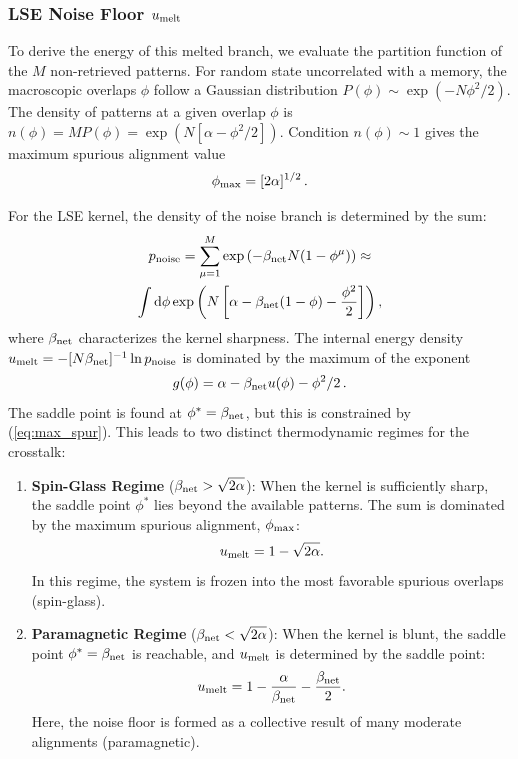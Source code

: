 \documentclass{article}
\newcommand{\dd}{{\mathrm{d}}}
\theoremstyle{plain}
\theoremstyle{definition}
\theoremstyle{remark}
\begin{document}
\subsubsection{LSE Noise Floor $u_{\rm melt}$}

To derive the energy of this melted branch, we evaluate the partition function of the $M$ non-retrieved patterns. For random state  uncorrelated with a memory, the macroscopic overlaps $\phi$ follow a Gaussian distribution $P(\phi) \sim \exp(-N\phi^2/2)$. The density of patterns at a given overlap $\phi$ is $n(\phi) = M P(\phi) = \exp(N[\alpha - \phi^2/2])$. Condition $n(\phi) \sim 1$ gives the maximum spurious alignment value 
\begin{equation}
    \phi_{\rm max} = [2\alpha]^{1/2}\,.
    \label{eq:max_spur}
\end{equation}

For the LSE kernel, the density of the noise branch is determined by the sum:
\begin{multline}
    p_{\rm noise} = \sum_{\mu=1}^{M} \exp\left( -\beta_{\rm net} N (1 - \phi^\mu) \right) \approx \\
    \int \dd\phi \exp\left( N \left[ \alpha - \beta_{\rm net}(1 - \phi) - \frac{\phi^2}{2} \right] \right),
\end{multline}
where $\beta_{\rm net}$ characterizes the kernel sharpness. The internal energy density $u_{\rm melt} = - [{N\beta_{\rm net}}]^{-1} \ln p_{\rm noise}$ is dominated by the maximum of the exponent 
\begin{equation}
    g(\phi) = \alpha - \beta_{\rm net} u(\phi) - \phi^2/2\,.
    \label{eq:g_phi}
\end{equation}
The saddle point is found at $\phi^* = \beta_{\rm net}$, but this is constrained by (\ref{eq:max_spur}). This leads to two distinct thermodynamic regimes for the crosstalk:

\begin{enumerate}
    \item \textbf{Spin-Glass Regime} ($\beta_{\rm net} > \sqrt{2\alpha}$): 
    When the kernel is sufficiently sharp, the saddle point $\phi^*$ lies beyond the available patterns. The sum is dominated by the maximum spurious alignment, $\phi_{\rm max}$:
    \begin{equation}
        u_{\rm melt} = 1 - \sqrt{2\alpha}.
    \end{equation}
    In this regime, the system is frozen into the most favorable spurious overlaps (spin-glass).
    
    \item \textbf{Paramagnetic Regime} ($\beta_{\rm net} < \sqrt{2\alpha}$): 
    When the kernel is blunt, the saddle point $\phi^* = \beta_{\rm net}$ is reachable, and $u_{\rm melt}$ is determined by the saddle point:
    \begin{equation}
        u_{\rm melt} = 1 - \frac{\alpha}{\beta_{\rm net}} - \frac{\beta_{\rm net}}{2}.
    \end{equation}
    Here, the noise floor is formed as a collective result of many moderate alignments (paramagnetic).
\end{enumerate}
\end{document}
